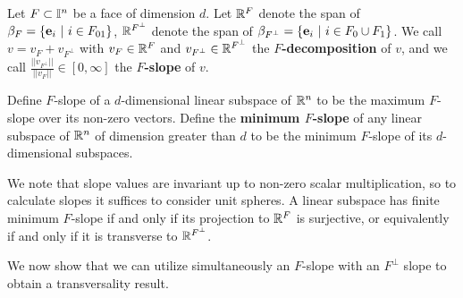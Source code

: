 \begin{definition}
Let $F \subset \mathbb{I}^n$ be a  face of dimension $d$. Let $\mathbb{R}^F$ denote the span of
$\beta_F = \{\mathbf{e}_i\ |\ i \in F_{01}\}$,  $\mathbb{R}^{F^\perp}$ denote the span of
 $\beta_{F^\perp} = \{\mathbf{e}_i\ |\ i \in F_0 \cup F_1\}$.  We call $v =  v_F +   v_{F^\perp}$ with
 $v_F \in \mathbb{R}^F$ and $v_{F^\perp} \in \mathbb{R}^{F^\perp}$
  the {\bf $F$-decomposition} of $v$, and we call $\frac{|| v_{F^\perp}||}{||v_{F}||}  \in [0,\infty]$ the {\bf $F$-slope} of $v$.

 Define  $F$-slope of a $d$-dimensional linear subspace of $\mathbb{R}^n$ to be
 the maximum $F$-slope over its non-zero vectors.   Define the {\bf minimum  $F$-slope}
 of any linear subspace of $\mathbb{R}^n$ of dimension greater than $d$
 to be the minimum  $F$-slope of its $d$-dimensional subspaces.
 \begin{comment}
 A vector $v$ is (within) {\bf $\varepsilon$-parallel} to $F$ if its slope with respect to $F$ is less than
 $\varepsilon$, and a
 subspace of $\R^n$ is $\varepsilon$-parallel to $F$ if all of its non-zero vectors are.
A c-manifold $W$ over $\interval^n$ is $\varepsilon$-parallel to $F$ if the image of the Jacobian of $r_W$ is
$\varepsilon$-parallel to $F$.
\end{comment}
\end{definition}

We note that slope values are invariant up to non-zero scalar multiplication, so to calculate slopes it suffices to consider unit spheres.
A linear subspace has finite minimum $F$-slope if and only if its projection to $\mathbb{R}^F$ is surjective, or equivalently if and only if it is transverse to $\mathbb{R}^{F^\perp}$.

We now show that we can utilize simultaneously an $F$-slope with an $F^\perp$ slope to obtain a transversality result.

